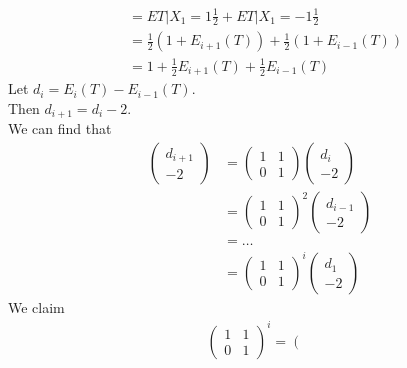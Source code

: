\documentclass{extarticle}
\theoremstyle{plain}
\theoremstyle{definition}
\begin{document}
\begin{enumerate}
\begin{align*}
	  	  		 &= E{T|X_1 = 1} \frac{1}{2} + E{T|X_1 = -1} \frac{1}{2} \\
	  	  		 &=\frac{1}{2}\left(1+E_{i+1}(T)\right) + \frac{1}{2}\left(1+E_{i-1}(T)\right)\\
	  	  		 &=1+\frac{1}{2}E_{i+1}(T) + \frac{1}{2}E_{i-1}(T)		
	  	\end{align*} 
		Let $d_i = E_i(T) - E_{i-1}(T)$.\\
		Then $d_{i+1} = d_i - 2$.\\
		We can find that 
		\begin{align*}
		  \left( \begin{array}{c}
		  	d_{i+1} \\
		  	-2
		  \end{array}
		  \right)
		   &= 
		  \left( 
		  		\begin{array}{cc}
		  		  1& 1 \\
		  		  0& 1
		  		\end{array}
		  \right)
		  \left( \begin{array}{c}
		  	d_{i} \\
		  	-2
		  \end{array}
		  \right) \\
		  &= 
		  \left( 
		  		\begin{array}{cc}
		  		  1& 1 \\
		  		  0& 1
		  		\end{array}
		  \right)^2
		  \left( \begin{array}{c}
		  	d_{i-1} \\
		  	-2
		  \end{array}
			\right) \\
		&= \ldots \\
		&=
		  \left( 
		  		\begin{array}{cc}
		  		  1& 1 \\
		  		  0& 1
		  		\end{array}
		  	  \right)^{i}
		  \left( \begin{array}{c}
		  	d_{1} \\
			-2
		  \end{array}
		\right) 
		\end{align*}
	We claim 
	\begin{align*}
		\left( 
		  		\begin{array}{cc}
		  		  1& 1 \\
		  		  0& 1
		  		\end{array}
		  \right)^i
		  =
		 \left( 
		  		\begin{array}{cc}

\end{array}
\end{align*}
\end{enumerate}
\end{document}
